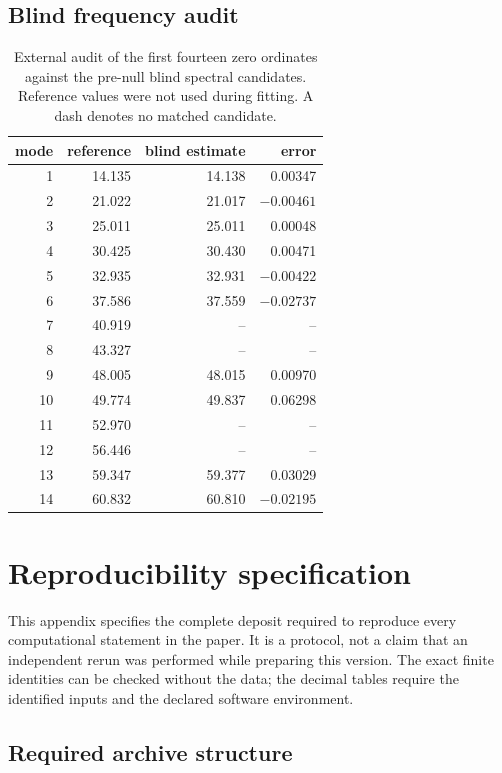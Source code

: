 \documentclass[11pt,reqno]{amsart}
\numberwithin{equation}{section}
\theoremstyle{plain}
\theoremstyle{definition}
\theoremstyle{remark}
\begin{document}
\subsection{Blind frequency audit}
\label{subsec:numerical-blind-frequencies}

\begin{table}[htbp]
\centering
\scriptsize
\caption{External audit of the first fourteen zero ordinates against the
pre-null blind spectral candidates.  Reference values were not used during
fitting.  A dash denotes no matched candidate.}
\label{tab:blind-frequency-audit}
\begin{tabular}{r r r r}
\toprule
mode&reference&blind estimate&error\\
\midrule
1&14.135&14.138&0.00347\\
2&21.022&21.017&\(-0.00461\)\\
3&25.011&25.011&0.00048\\
4&30.425&30.430&0.00471\\
5&32.935&32.931&\(-0.00422\)\\
6&37.586&37.559&\(-0.02737\)\\
7&40.919&--&--\\
8&43.327&--&--\\
9&48.005&48.015&0.00970\\
10&49.774&49.837&0.06298\\
11&52.970&--&--\\
12&56.446&--&--\\
13&59.347&59.377&0.03029\\
14&60.832&60.810&\(-0.02195\)\\
\bottomrule
\end{tabular}
\end{table}

\section{Reproducibility specification}
\label{app:reproducibility}

This appendix specifies the complete deposit required to reproduce every
computational statement in the paper.  It is a protocol, not a claim that an
independent rerun was performed while preparing this version.  The exact
finite identities can be checked without the data; the decimal tables require
the identified inputs and the declared software environment.

\subsection{Required archive structure}
\label{subsec:archive-structure}
\end{document}
